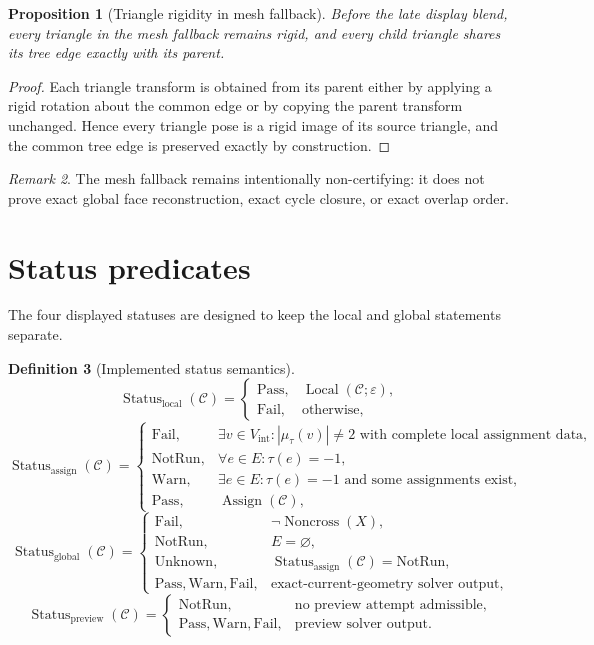 \documentclass[11pt]{article}
\newtheorem{definition}{Definition}[section]
\newtheorem{proposition}[definition]{Proposition}
\theoremstyle{remark}
\newtheorem{remark}[definition]{Remark}
\newcommand{\CP}{\mathcal{C}}
\newcommand{\eps}{\varepsilon}
\newcommand{\abs}[1]{\left\lvert #1 \right\rvert}
\newcommand{\Pass}{\mathrm{Pass}}
\newcommand{\Fail}{\mathrm{Fail}}
\newcommand{\Warn}{\mathrm{Warn}}
\newcommand{\NotRun}{\mathrm{NotRun}}
\newcommand{\Unknown}{\mathrm{Unknown}}
\begin{document}
\begin{proposition}[Triangle rigidity in mesh fallback]
Before the late display blend, every triangle in the mesh fallback remains
rigid, and every child triangle shares its tree edge exactly with its parent.
\end{proposition}

\begin{proof}
Each triangle transform is obtained from its parent either by applying a rigid
rotation about the common edge or by copying the parent transform unchanged.
Hence every triangle pose is a rigid image of its source triangle, and the
common tree edge is preserved exactly by construction.
\end{proof}

\begin{remark}
The mesh fallback remains intentionally non-certifying: it does not prove exact
global face reconstruction, exact cycle closure, or exact overlap order.
\end{remark}

\section{Status predicates}

The four displayed statuses are designed to keep the local and global
statements separate.

\begin{definition}[Implemented status semantics]
\[
\operatorname{Status}_{\mathrm{local}}(\CP)
=
\begin{cases}
\Pass,& \operatorname{Local}(\CP;\eps),\\
\Fail,& \text{otherwise},
\end{cases}
\]
\[
\operatorname{Status}_{\mathrm{assign}}(\CP)
=
\begin{cases}
\Fail,& \exists v\in V_{\mathrm{int}}:\abs{\mu_\tau(v)}\ne 2
\text{ with complete local assignment data},\\
\NotRun,& \forall e\in E:\tau(e)=-1,\\
\Warn,& \exists e\in E:\tau(e)=-1 \text{ and some assignments exist},\\
\Pass,& \operatorname{Assign}(\CP),
\end{cases}
\]
\[
\operatorname{Status}_{\mathrm{global}}(\CP)
=
\begin{cases}
\Fail,& \neg\operatorname{Noncross}(X),\\
\NotRun,& E=\varnothing,\\
\Unknown,& \operatorname{Status}_{\mathrm{assign}}(\CP)=\NotRun,\\
\Pass,\Warn,\Fail,& \text{exact-current-geometry solver output},
\end{cases}
\]
\[
\operatorname{Status}_{\mathrm{preview}}(\CP)
=
\begin{cases}
\NotRun,& \text{no preview attempt admissible},\\
\Pass,\Warn,\Fail,& \text{preview solver output}.
\end{cases}
\]
\end{definition}
\end{document}
